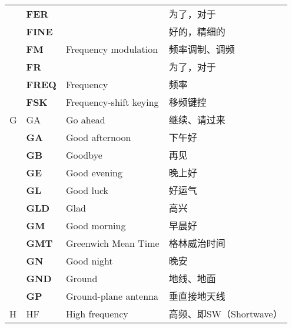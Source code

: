 \begin{longtable}[l]{llll}
    & \textbf{FER}                      &                                         & 为了，对于               \\
    & \textbf{FINE}                     &                                         & 好的，精细的              \\
    & \textbf{FM}                       & Frequency modulation                    & 频率调制、调频             \\
    & \textbf{FR}                       &                                         & 为了，对于               \\
    & \textbf{FREQ}                     & Frequency                               & 频率                  \\
    & \textbf{FSK}                      & Frequency-shift keying                  & 移频键控                \\
  G & GA                                & Go ahead                                & 继续、请过来              \\
    & \textbf{GA}                       & Good afternoon                          & 下午好                 \\
    & \textbf{GB}                       & Goodbye                                 & 再见                  \\
    & \textbf{GE}                       & Good evening                            & 晚上好                 \\
    & \textbf{GL}                       & Good luck                               & 好运气                 \\
    & \textbf{GLD}                      & Glad                                    & 高兴                  \\
    & \textbf{GM}                       & Good morning                            & 早晨好                 \\
    & \textbf{GMT}                      & Greenwich Mean Time                     & 格林威治时间              \\ %
    & \textbf{GN}                       & Good night                              & 晚安                  \\
    & \textbf{GND}                      & Ground                                  & 地线、地面               \\
    & \textbf{GP}                       & Ground-plane antenna                    & 垂直接地天线              \\
  H & HF                                & High frequency                          & 高频、即SW（Shortwave）   \\

\end{longtable}
